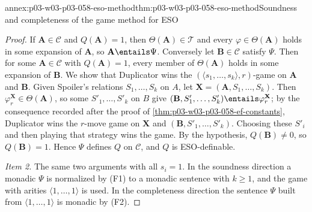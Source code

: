 \begin{annexitem}{annex:p03-w03-p03-058-eso-method}{thm:p03-w03-p03-058-eso-method}{Soundness and completeness of the game method for ESO}
\begin{proof}
If \(\mathbf A\in\mathcal C\) and \(Q(\mathbf A)=1\), then
\(\Theta(\mathbf A)\in\mathcal T\) and every \(\varphi\in\Theta(\mathbf A)\)
holds in some expansion of \(\mathbf A\), so \(\mathbf A\entails\Psi\).
Conversely let \(\mathbf B\in\mathcal C\) satisfy \(\Psi\). Then for some
\(\mathbf A\in\mathcal C\) with \(Q(\mathbf A)=1\), every member of
\(\Theta(\mathbf A)\) holds in some expansion of \(\mathbf B\). We show that
Duplicator wins the \((\langle s_1,\ldots,s_k\rangle,r)\)-game on
\(\mathbf A\) and \(\mathbf B\). Given Spoiler's relations
\(S_1,\ldots,S_k\) on \(A\), let \(\mathbf X=(\mathbf A,S_1,\ldots,S_k)\).
Then \(\varphi^{\mathbf X}_r\in\Theta(\mathbf A)\), so some
\(S'_1,\ldots,S'_k\) on \(B\) give
\((\mathbf B,S'_1,\ldots,S'_k)\entails\varphi^{\mathbf X}_r\); by the
consequence recorded after the proof of \cref{thm:p03-w03-p03-058-ef-constants},
Duplicator wins the \(r\)-move game on \(\mathbf X\) and
\((\mathbf B,S'_1,\ldots,S'_k)\). Choosing these \(S'_i\) and then playing
that strategy wins the game. By the hypothesis, \(Q(\mathbf B)\ne0\), so
\(Q(\mathbf B)=1\). Hence \(\Psi\) defines \(Q\) on \(\mathcal C\), and
\(Q\) is ESO-definable.

\emph{Item 2.} The same two arguments with all \(s_i=1\). In the soundness
direction a monadic \(\Psi\) is normalized by (F1) to a monadic sentence
with \(k\ge1\), and the game with arities \(\langle1,\ldots,1\rangle\) is
used. In the completeness direction the sentence \(\Psi\) built from
\(\langle1,\ldots,1\rangle\) is monadic by (F2).
\end{proof}
\end{annexitem}

